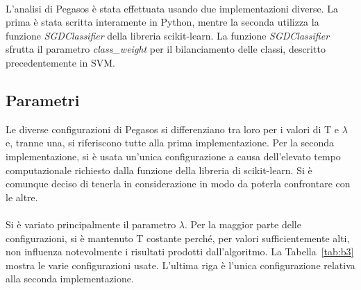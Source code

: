 \paragraph*{}
L'analisi di Pegasos è stata effettuata usando due implementazioni diverse. La prima è stata scritta interamente in Python, mentre la seconda utilizza la funzione \textit{SGDClassifier} della libreria scikit-learn.
La funzione \textit{SGDClassifier} sfrutta il parametro \textit{class\_weight} per il bilanciamento delle classi, descritto precedentemente in SVM.  

\subsection{Parametri}
Le diverse configurazioni di Pegasos si differenziano tra loro per i valori di T e $\lambda$ e, tranne una, si riferiscono tutte alla prima implementazione. Per la seconda implementazione, si è usata un'unica configurazione a causa dell'elevato tempo computazionale richiesto dalla funzione della libreria di scikit-learn. Si è comunque deciso di tenerla in considerazione in modo da poterla confrontare con le altre.

\paragraph*{}
Si è variato principalmente il parametro $\lambda$. Per la maggior parte delle configurazioni, si è mantenuto T costante perché, per valori sufficientemente alti, non influenza notevolmente i risultati prodotti dall'algoritmo. La Tabella~\ref{tab:b3} mostra le varie configurazioni usate. L'ultima riga è l'unica configurazione relativa alla seconda implementazione.

